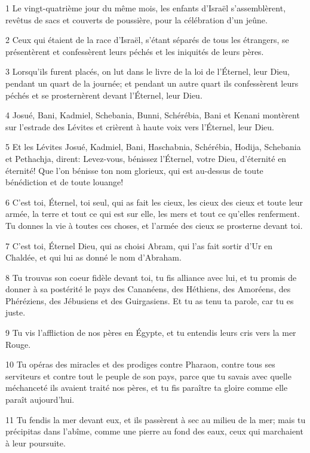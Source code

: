 \par 1 Le vingt-quatrième jour du même mois, les enfants d'Israël s'assemblèrent, revêtus de sacs et couverts de poussière, pour la célébration d'un jeûne.
\par 2 Ceux qui étaient de la race d'Israël, s'étant séparés de tous les étrangers, se présentèrent et confessèrent leurs péchés et les iniquités de leurs pères.
\par 3 Lorsqu'ils furent placés, on lut dans le livre de la loi de l'Éternel, leur Dieu, pendant un quart de la journée; et pendant un autre quart ils confessèrent leurs péchés et se prosternèrent devant l'Éternel, leur Dieu.
\par 4 Josué, Bani, Kadmiel, Schebania, Bunni, Schérébia, Bani et Kenani montèrent sur l'estrade des Lévites et crièrent à haute voix vers l'Éternel, leur Dieu.
\par 5 Et les Lévites Josué, Kadmiel, Bani, Haschabnia, Schérébia, Hodija, Schebania et Pethachja, dirent: Levez-vous, bénissez l'Éternel, votre Dieu, d'éternité en éternité! Que l'on bénisse ton nom glorieux, qui est au-dessus de toute bénédiction et de toute louange!
\par 6 C'est toi, Éternel, toi seul, qui as fait les cieux, les cieux des cieux et toute leur armée, la terre et tout ce qui est sur elle, les mers et tout ce qu'elles renferment. Tu donnes la vie à toutes ces choses, et l'armée des cieux se prosterne devant toi.
\par 7 C'est toi, Éternel Dieu, qui as choisi Abram, qui l'as fait sortir d'Ur en Chaldée, et qui lui as donné le nom d'Abraham.
\par 8 Tu trouvas son coeur fidèle devant toi, tu fis alliance avec lui, et tu promis de donner à sa postérité le pays des Cananéens, des Héthiens, des Amoréens, des Phéréziens, des Jébusiens et des Guirgasiens. Et tu as tenu ta parole, car tu es juste.
\par 9 Tu vis l'affliction de nos pères en Égypte, et tu entendis leurs cris vers la mer Rouge.
\par 10 Tu opéras des miracles et des prodiges contre Pharaon, contre tous ses serviteurs et contre tout le peuple de son pays, parce que tu savais avec quelle méchanceté ils avaient traité nos pères, et tu fis paraître ta gloire comme elle paraît aujourd'hui.
\par 11 Tu fendis la mer devant eux, et ils passèrent à sec au milieu de la mer; mais tu précipitas dans l'abîme, comme une pierre au fond des eaux, ceux qui marchaient à leur poursuite.
